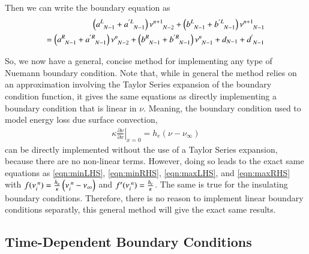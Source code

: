 \documentclass[letterpaper,12pt]{article}
\newcommand \bcf{f}
\begin{document}
Then we can write the boundary equation as
\begin{align}
  \left( a\indices{^L_{N-1}} + a\indices{^{'L}_{N-1}} \right) \nu\indices{^{n+1}_{N-2}}
+ \left( b\indices{^L_{N-1}} + b\indices{^{'L}_{N-1}} \right) \nu\indices{^{n+1}_{N-1}} \nonumber \\
=
  \left( a\indices{^R_{N-1}} + a\indices{^{'R}_{N-1}} \right) \nu\indices{^{n  }_{N-2}}
+ \left( b\indices{^R_{N-1}} + b\indices{^{'R}_{N-1}} \right) \nu\indices{^{n  }_{N-1}}
+ d_{N-1} + d\indices{^'_{N-1}}
\end{align}

So, we now have a general, concise method for implementing any type of Nuemann boundary condition. Note that, while in general the
method relies on an approximation involving the Taylor Series expansion of the boundary condition function, it gives the same
equations as directly implementing a boundary condition that is linear in $\nu$. Meaning, the boundary condition used to model energy loss
due surface convection,
\begin{align}
  \kappa \left.\frac{\partial \nu}{\partial x}\right|_{x=0} = h_e \left(\nu - \nu_{\infty}\right)
\end{align}
can be directly implemented without the use of a Taylor Series expansion, because there are no non-linear terms. However, doing
so leads to the exact same equations as \ref{eqn:minLHS}, \ref{eqn:minRHS}, \ref{eqn:maxLHS}, and \ref{eqn:maxRHS} with
$\bcf(\nu\indices{_{i}^n}) = \frac{h_e}{\kappa} \left(\nu\indices{_i^n} - \nu_{\infty}\right)$ and 
$\bcf'(\nu\indices{_{i}^n}) = \frac{h_e}{\kappa}$. The same is true for the insulating boundary conditions.
Therefore, there is no reason to implement linear boundary conditions separatly, this general method will give the exact same
results.

\subsection{Time-Dependent Boundary Conditions}
\end{document}
